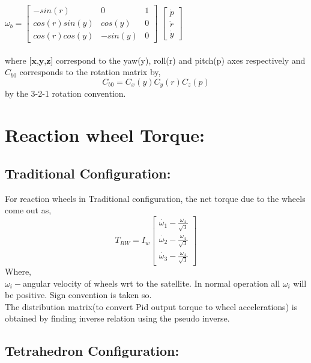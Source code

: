 \documentclass[10pt,a4paper]{report}
\begin{document}
$
\omega_{b} =\begin{bmatrix}
-sin(r) & 0 & 1\\
cos(r) sin(y)&cos(y)&0\\
cos(r) cos(y)&-sin(y)&0
\end{bmatrix}
$ $
\begin{bmatrix}
\dot{p}\\ \dot{r} \\ \dot{y}
\end{bmatrix}
$\\ \\
where [$\textbf{x}$,$\textbf{y}$,$\textbf{z}$]  correspond to the yaw(y), roll(r) and pitch(p) axes respectively and $ C_{b0} $ corresponds to the rotation matrix by,
\begin{equation}
C_{b0}=C_{x}(y)C_{y}(r)C_{z}(p)
\end{equation}
by the 3-2-1 rotation convention.
\section{Reaction wheel Torque:}
\subsection{Traditional Configuration:}
For reaction wheels in Traditional configuration, the net torque due to the wheels come out as,
\begin{equation}
T_{RW}=I_{w}\begin{bmatrix}
\dot{\omega_{1}}-\frac{\omega_{4}}{\sqrt{3}}\\
\dot{\omega_{2}}-\frac{\omega_{4}}{\sqrt{3}}\\
\dot{\omega_{3}}-\frac{\omega_{4}}{\sqrt{3}}
\end{bmatrix}
\end{equation}
Where, \\
$\omega_{i}-$angular velocity of wheels wrt to the satellite. In normal operation all $\omega_{i}$ will be positive. Sign convention is taken so. \\
The distribution matrix(to convert Pid output torque to wheel accelerations) is obtained by finding inverse relation using the pseudo inverse.\\


\subsection{Tetrahedron Configuration:}
\end{document}
